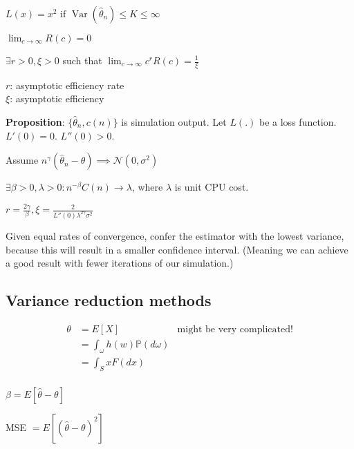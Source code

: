 \documentclass{article}
\DeclareMathOperator{\Var}{Var}
\begin{document}
$L(x) = x^2\text{ if } \Var(\hat\theta_n) \le K \le \infty$

$\lim_{c\to\infty} R(c) = 0$

\begin{definition}

    $\exists r > 0, \xi > 0$ such that $\lim_{c\to\infty} c^r R(c) =
    \frac{1}{\xi}$

    $r$: asymptotic efficiency rate\\
    $\xi$: asymptotic efficiency

\end{definition}

\textbf{Proposition}: $\{\hat\theta_n, c(n)\}$ is simulation output. Let
$L(.)$ be a loss function. $L'(0) = 0$. $L''(0) > 0$.

Assume $n^\gamma(\hat\theta_n - \theta) \implies \mathcal{N}(0,
\sigma^2)$

$\exists \beta > 0, \lambda > 0: n^{-\beta}C(n) \to \lambda$, where
$\lambda$ is unit CPU cost.

$r = \frac{2\gamma}{\beta}, \xi =
\frac{2}{L''(0)\lambda^{2\gamma}\sigma^2}$

Given equal rates of convergence, confer the estimator with the lowest
variance, because this will result in a smaller confidence interval.
(Meaning we can achieve a good result with fewer iterations of our
simulation.)

\subsection{Variance reduction methods}

\begin{align*}
    \theta & = E[X] & \text{might be very complicated!} \\
           & = \int_\omega h(w)\mathbb P(d\omega) \\ 
           & = \int_S x F(dx) \\
\end{align*}

$\beta = E[\hat\theta-\theta]$

MSE $= E[(\hat\theta - \theta)^2]$
\end{document}
